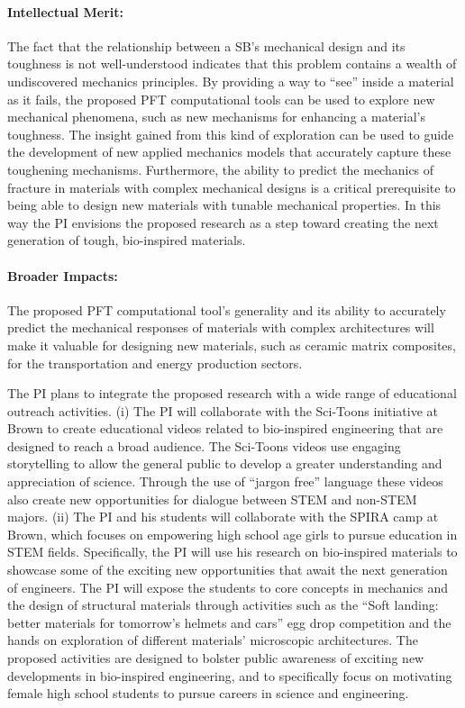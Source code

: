 \documentclass[10pt,letterpaper]{article}
\begin{document}
\paragraph{Intellectual Merit:}
The fact that the relationship between a SB's mechanical design and its toughness is not well-understood indicates that this problem contains a wealth of undiscovered mechanics principles. By providing a way to ``see'' inside a material as it fails, the proposed PFT computational tools can be used to explore new mechanical phenomena, such as new mechanisms for enhancing a material's toughness. The insight gained from this kind of exploration can be used to guide the development of new applied mechanics models that accurately capture these toughening mechanisms. Furthermore, the ability to predict the mechanics of fracture in materials with complex mechanical designs is a critical prerequisite to being able to design new materials with tunable mechanical properties. In this way the PI envisions the proposed research as a step toward creating the next generation of tough, bio-inspired materials.

\paragraph{Broader Impacts:}
The proposed PFT computational tool's generality and its ability to accurately predict the mechanical responses of materials with complex architectures will make it valuable for designing new materials, such as ceramic matrix composites, for the transportation and energy production sectors.

The PI plans to integrate the proposed research with a wide range of educational outreach activities. (i) The PI will collaborate with the Sci-Toons initiative at Brown to create educational videos related to bio-inspired engineering that are designed to reach a broad audience. The Sci-Toons videos use engaging storytelling to allow the general public to develop a greater understanding and appreciation of science. Through the use of ``jargon free'' language these videos also create new opportunities for dialogue between STEM and non-STEM majors. (ii) The PI and his students will collaborate with the SPIRA camp at Brown, which focuses on empowering high school age girls to pursue education in STEM fields. Specifically, the PI will use his research on bio-inspired materials to showcase some of the exciting new opportunities that await the next generation of engineers. The PI will expose the students to core concepts in mechanics and the design of structural materials through activities such as the ``Soft landing: better materials for tomorrow's helmets and cars'' egg drop competition and the hands on exploration of different materials' microscopic architectures. The proposed activities are designed to bolster public awareness of exciting new developments in bio-inspired engineering, and to specifically focus on motivating female high school students to pursue careers in science and engineering.
\end{document}
